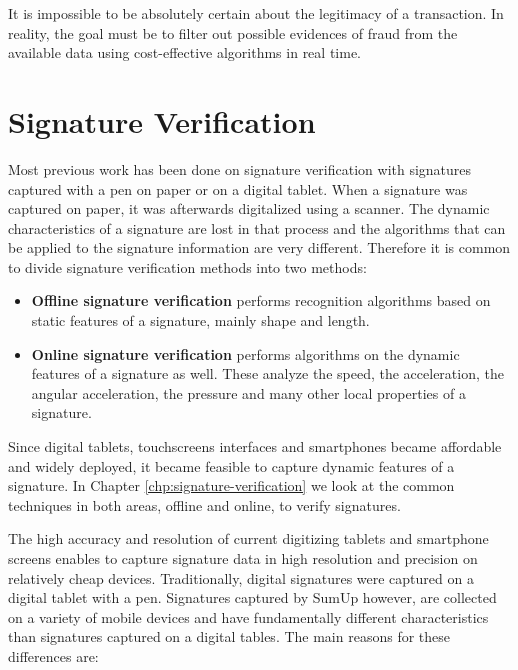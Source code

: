 \documentclass[a4paper, oneside]{csthesis}
\begin{document}
It is impossible to be absolutely certain about the legitimacy of a transaction. In reality, the goal must be to filter out possible evidences of fraud from the available data using cost-effective algorithms in real time.








\section{Signature Verification}

Most previous work has been done on signature verification with signatures captured with a pen on paper or on a digital tablet. When a signature was captured on paper, it was afterwards digitalized using a scanner. The dynamic characteristics of a signature are lost in that process and the algorithms that can be applied to the signature information are very different. Therefore it is common to divide signature verification methods into two methods:

\begin{itemize}
\item \textbf{Offline signature verification} performs recognition algorithms based on static features of a signature, mainly shape and length.
\item \textbf{Online signature verification} performs algorithms on the dynamic features of a signature as well. These analyze the speed, the acceleration, the angular acceleration, the pressure and many other local properties of a signature.
\end{itemize}

Since digital tablets, touchscreens interfaces and smartphones became affordable and widely deployed, it became feasible to capture dynamic features of a signature. In Chapter \ref{chp:signature-verification} we look at the common techniques in both areas, offline and online, to verify signatures.

The high accuracy and resolution of current digitizing tablets and smartphone screens enables to capture signature data in high resolution and precision on relatively cheap devices.
Traditionally, digital signatures were captured on a digital tablet with a pen. Signatures captured by SumUp however, are collected on a variety of mobile devices and have fundamentally different characteristics than signatures captured on a digital tables. The main reasons for these differences are:
\end{document}

